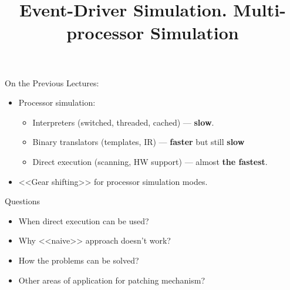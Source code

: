 
\title{Event-Driver Simulation. Multi-processor Simulation}



\startslides

\begin{frame}{On the Previous Lectures:}
\begin{itemize}
\item Processor simulation:
  \begin{itemize}
  \item Interpreters (switched, threaded, cached) --- \textbf{slow}.
  \item Binary translators (templates, IR) --- \textbf{faster} but still
    \textbf{slow}
  \item Direct execution (scanning, HW support) --- almost
    \textbf{the fastest}.
  \end{itemize}
\item{<<Gear shifting>> for processor simulation modes.}
\end{itemize}
\end{frame}

\begin{frame}{Questions}
\begin{itemize}
\item When direct execution can be used?\pause
\item Why <<naive>> approach doesn't work?\pause
\item How the problems can be solved?\pause
\item Other areas of application for patching mechanism?
\end{itemize}
\end{frame}

